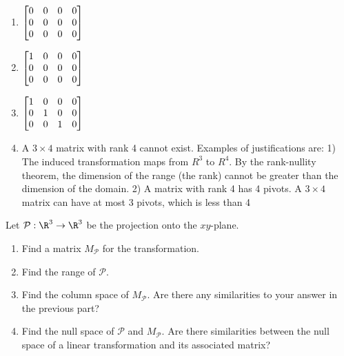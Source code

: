 \begin{exercises}
\begin{problist}
		\begin{solution}
			\begin{enumerate}
				\item $\mat{0&0&0&0\\0&0&0&0\\0&0&0&0}$

				\item $\mat{1&0&0&0\\0&0&0&0\\0&0&0&0}$

				\item $\mat{1&0&0&0\\0&1&0&0\\0&0&1&0}$

				\item A $3\times4$ matrix with rank 4 cannot exist. Examples of justifications
					are: 1) The induced transformation maps from $R^{3}$ to $R^{4}$. By
					the rank-nullity theorem, the dimension of the range (the rank) cannot
					be greater than the dimension of the domain. 2) A matrix with rank 4
					has 4 pivots. A $3\times4$ matrix can have at most 3 pivots, which is
					less than 4
			\end{enumerate}
		\end{solution}

		\prob Let $\mathcal{P}:\R^3\to\R^3$ be the projection onto the $xy$-plane.
		\begin{enumerate}
			\item Find a matrix $M_\mathcal{P}$ for the transformation.
			\item Find the range of $\mathcal{P}$.
			\item Find the column space of $M_\mathcal{P}$. Are there any similarities to your answer in the previous part?
			\item Find the null space of $\mathcal{P}$ and $M_\mathcal{P}$. Are there similarities between the null space of a linear transformation and its associated matrix?
		\end{enumerate}


\end{problist}
\end{exercises}

